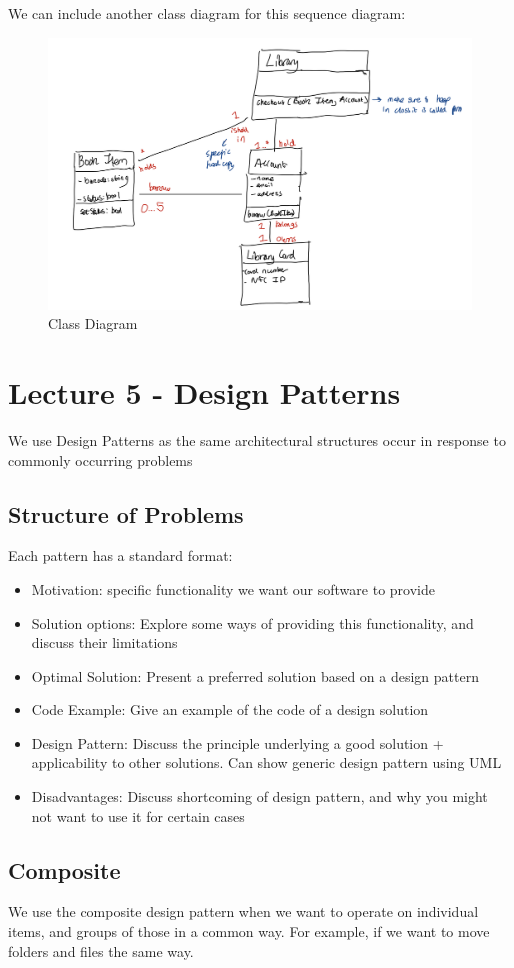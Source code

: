 \documentclass{article}
\begin{document}
We can include another class diagram for this sequence diagram:
\begin{figure}[H]
    \centering
    \includegraphics[width = 0.7\linewidth]{Pictures/Screenshot 2023-02-01 at 12.00.26.png}
    \caption{Class Diagram}    
\end{figure}
\section{Lecture 5 - Design Patterns}
We use Design Patterns as the same architectural structures occur in response to commonly occurring problems
\subsection{Structure of Problems}
Each pattern has a standard format:
\begin{itemize}
    \item Motivation: specific functionality we want our software to provide
    \item Solution options: Explore some ways of providing this functionality, and discuss their limitations
    \item Optimal Solution: Present a preferred solution based on a design pattern
    \item Code Example: Give an example of the code of a design solution 
    \item Design Pattern: Discuss the principle underlying a good solution + applicability to other solutions. Can show generic design pattern using UML
    \item Disadvantages: Discuss shortcoming of design pattern, and why you might not want to use it for certain cases
\end{itemize}
\subsection{Composite}
We use the composite design pattern when we want to operate on individual items, and groups of those in a common way. For example, if we want to move folders and files the same way. \\
\end{document}
